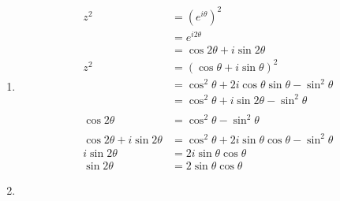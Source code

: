 \documentclass{article}
\begin{document}
\setcounter{subsection}{48}
\subsection{}

\begin{enumerate}
  \item

        \begin{align*}
          z^2                             & = (e^{i \theta})^2                                            \\
                                          & = e^{i 2 \theta}                                              \\
                                          & = \cos 2 \theta + i \sin 2 \theta                             \\
          z^2                             & = (\cos \theta + i \sin \theta)^2                             \\
                                          & = \cos^2 \theta + 2 i \cos \theta \sin \theta - \sin^2 \theta \\
                                          & = \cos^2 \theta + i \sin 2 \theta - \sin^2 \theta             \\ \\
          \cos 2 \theta                   & = \cos^2 \theta - \sin^2 \theta                               \\ \\
          \cos 2 \theta + i \sin 2 \theta & = \cos^2 \theta + 2 i \sin \theta \cos \theta - \sin^2 \theta \\
          i \sin 2 \theta                 & = 2 i \sin \theta \cos \theta                                 \\
          \sin 2 \theta                   & = 2 \sin \theta \cos \theta
        \end{align*}

  \item


\end{enumerate}
\end{document}
